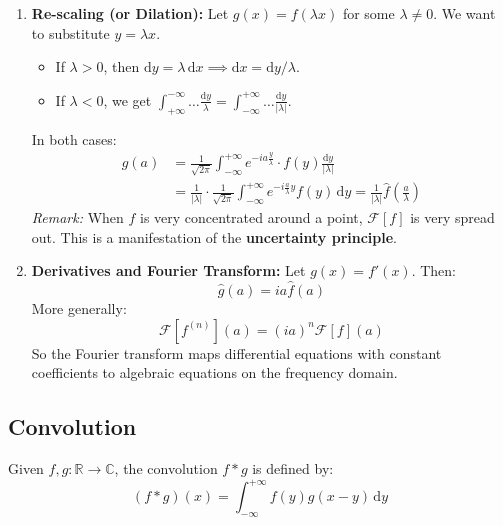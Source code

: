\begin{proposition}[Properties]
\begin{enumerate}
    \item \textbf{Re-scaling (or Dilation):} Let $g(x) = f(\lambda x)$ for some $\lambda \neq 0$. 
    We want to substitute $y = \lambda x$. 
    \begin{itemize}
        \item If $\lambda > 0$, then $\mathrm{d}y = \lambda \,\mathrm{d}x \implies \mathrm{d}x = \mathrm{d}y / \lambda$.
        \item If $\lambda < 0$, we get $\int_{+\infty}^{-\infty} \dots \frac{\mathrm{d}y}{\lambda} = \int_{-\infty}^{+\infty} \dots \frac{\mathrm{d}y}{|\lambda|}$.
    \end{itemize}
    In both cases:
    \begin{align*}
        \hat{g}(a) &= \frac{1}{\sqrt{2\pi}} \int_{-\infty}^{+\infty} e^{-ia\frac{y}{\lambda}} \cdot f(y) \frac{\mathrm{d}y}{|\lambda|} \\
        &= \frac{1}{|\lambda|} \cdot \frac{1}{\sqrt{2\pi}} \int_{-\infty}^{+\infty} e^{-i\frac{a}{\lambda}y} f(y) \,\mathrm{d}y 
        = \frac{1}{|\lambda|} \hat{f}\left(\frac{a}{\lambda}\right)
    \end{align*}
    \textit{Remark:} When $f$ is very concentrated around a point, $\mathcal{F}[f]$ is very spread out. This is a manifestation of the \textbf{uncertainty principle}.
    
    \item \textbf{Derivatives and Fourier Transform:} Let $g(x) = f'(x)$. Then:
    \begin{equation*}
        \hat{g}(a) = ia\hat{f}(a)
    \end{equation*}
    More generally:
    \begin{equation*}
        \mathcal{F}[f^{(n)}](a) = (ia)^n \mathcal{F}[f](a)
    \end{equation*}
    So the Fourier transform maps differential equations with constant coefficients to algebraic equations on the frequency domain.
\end{enumerate}
\end{proposition}


\subsection{Convolution}

\begin{definition}
Given $f, g: \mathbb{R} \to \mathbb{C}$, the convolution $f * g$ is defined by:
\begin{equation}
    (f * g)(x) = \int_{-\infty}^{+\infty} f(y) g(x - y) \,\mathrm{d}y
\end{equation}
\end{definition}


